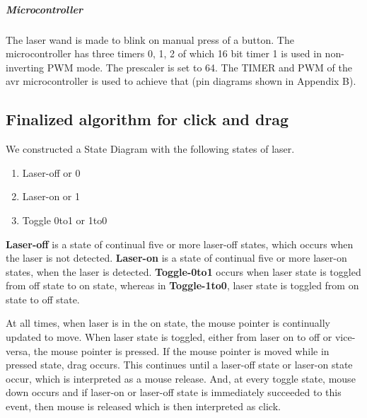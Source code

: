 \documentclass[12pt, a4paper]{article}
\begin{document}
\subparagraph{Microcontroller}

The laser wand is made to blink on manual press of a button. The microcontroller has three timers 0, 1, 2 of which 16 bit timer 1 is used in non-inverting PWM mode. The prescaler is set to 64. The TIMER and PWM of the avr microcontroller is used to achieve that (pin diagrams shown in Appendix B).

\subsection{Finalized algorithm for click and drag}
	We constructed a State Diagram with the following states of laser.
\begin{enumerate}
\item Laser-off or 0
\item Laser-on or 1
\item Toggle 0to1 or 1to0 
\end{enumerate}

	\textbf {Laser-off} is a state of continual five or more laser-off  states, which occurs when the laser is not detected. \textbf{Laser-on} is a state of continual five or more laser-on states, when the laser is detected. \textbf{Toggle-0to1} occurs when laser state is toggled from off state to on state, whereas in \textbf{Toggle-1to0}, laser state is toggled from on state to off state. 
	
	At all times, when laser is in the on state, the mouse pointer is continually updated to move. When laser state is toggled, either from laser on to off or vice-versa, the mouse pointer is pressed. If the mouse pointer is moved while in pressed state, drag occurs. This continues until a laser-off state or laser-on state occur, which is interpreted as a mouse release. And, at every toggle state, mouse down occurs and if laser-on or laser-off state is immediately succeeded to this event, then mouse is released which is then interpreted as click.
	
\end{document}
